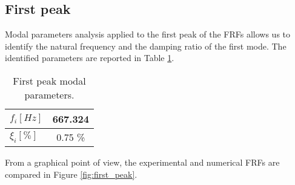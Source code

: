 \subsection{First peak}
\label{subsec:first_peak}

Modal parameters analysis applied to the first peak of the FRFs allows us to identify the natural frequency and the damping ratio of the first mode.
The identified parameters are reported in Table \ref{tab:first_peak}.

\begin{table}[H]
    \centering
    \begin{tabular}{lc}
        \hline
        $f_i [Hz]$   & 667.324 \\
        \hline
        $\xi_i [\%]$ & 0.75 \% \\
        \hline
    \end{tabular}
    \caption{First peak modal parameters.}
    \label{tab:first_peak}
\end{table}

From a graphical point of view, the experimental and numerical FRFs are compared in Figure \ref{fig:first_peak}.

